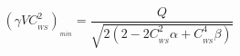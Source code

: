 \begin{equation}
(\gamma VC_{_{WS}}^2)_{_{min}}= \frac{Q}{\sqrt{2(2-2C_{_{WS}}^2
\alpha+C_{_{WS}}^4\beta)}}
\end{equation}

